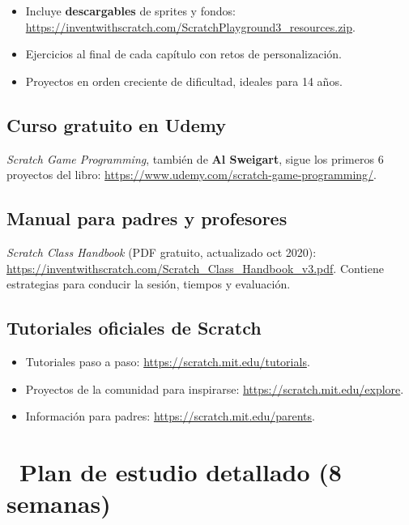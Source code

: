 \documentclass[11pt,a4paper]{article}
\newcommand{\iconotexto}[2]{\textcolor{cyanNeon}{\faIcon{#1}}~#2}
\begin{document}
\begin{itemize}
  \item Incluye \textbf{descargables} de sprites y fondos:
        \url{https://inventwithscratch.com/ScratchPlayground3_resources.zip}.
  \item Ejercicios al final de cada capítulo con retos de personalización.
  \item Proyectos en orden creciente de dificultad, ideales para 14 años.
\end{itemize}

\subsection{Curso gratuito en Udemy}

\textit{Scratch Game Programming}, también de \textbf{Al Sweigart}, sigue los
primeros 6 proyectos del libro: \url{https://www.udemy.com/scratch-game-programming/}.

\subsection{Manual para padres y profesores}

\textit{Scratch Class Handbook} (PDF gratuito, actualizado oct 2020):
\url{https://inventwithscratch.com/Scratch_Class_Handbook_v3.pdf}.
Contiene estrategias para conducir la sesión, tiempos y evaluación.

\subsection{Tutoriales oficiales de Scratch}

\begin{itemize}
  \item Tutoriales paso a paso: \url{https://scratch.mit.edu/tutorials}.
  \item Proyectos de la comunidad para inspirarse: \url{https://scratch.mit.edu/explore}.
  \item Información para padres: \url{https://scratch.mit.edu/parents}.
\end{itemize}

\section{\iconotexto{calendar-alt}{Plan de estudio detallado (8 semanas)}}
\end{document}
